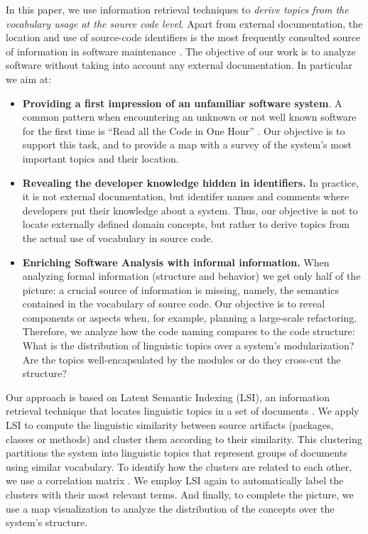 \documentclass[10pt]{book}
\begin{document}
In this paper, we use information retrieval techniques to \emph{derive topics from the vocabulary usage at the source code level}. Apart from external documentation, the location and use of source-code identifiers is the most frequently consulted source of information in software maintenance \cite{Kosk04a}. The objective of our work is to analyze software without taking into account any external documentation. In particular we aim at:

\begin{itemize}
  \item \textbf{Providing a first impression of an unfamiliar software system}. A common pattern when encountering an unknown or not well known software for the first time is ``Read all the Code in One Hour'' \cite{Deme02a}. Our objective is to support this task, and to provide a map with a survey of the system's most important topics and their location.
  \item \textbf{Revealing the developer knowledge hidden in identifiers.} In practice, it is not external documentation, but identifer names and comments where developers put their knowledge about a system. Thus, our objective is not to locate externally defined domain concepts, but rather to derive topics from the actual use of vocabulary in source code.
  \item \textbf{Enriching Software Analysis with informal information.} When analyzing formal information (\eg structure and behavior) we get only half of the picture: a crucial source of information is missing, namely, the semantics contained in the vocabulary of source code. Our objective is to reveal components or aspects when, for example, planning a large-scale refactoring. Therefore, we analyze how the code naming compares to the code structure: What is the distribution of linguistic topics over a system's modularization? Are the topics well-encapsulated by the modules or do they cross-cut the structure?
\end{itemize}


Our approach is based on Latent Semantic Indexing (LSI), an information retrieval technique that locates linguistic topics in a set of documents \cite{Deer90a,Marc04a}. We apply LSI to compute the linguistic similarity between source artifacts (\eg packages, classes or methods) and cluster them according to their similarity. This clustering partitions the system into linguistic topics that represent groups of documents using similar vocabulary. To identify how the clusters are related to each other, we use a correlation matrix \cite{Ling73a}. We employ LSI again to automatically label the clusters with their most relevant terms. And finally, to complete the picture, we use a map visualization to analyze the distribution of the concepts over the system's structure.
\end{document}
